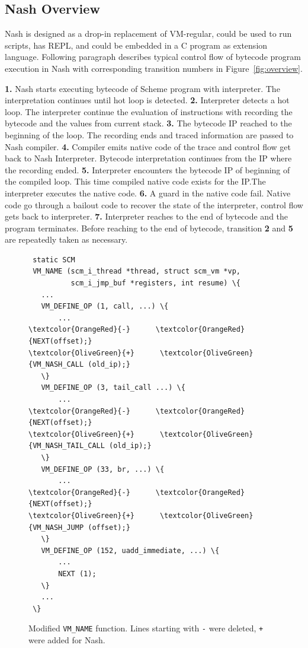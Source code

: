 \documentclass[preprint, 10pt]{sigplanconf}
\begin{document}
\subsection{Nash Overview}
\label{sec:overview}


Nash is designed as a drop-in replacement of VM-regular, could be used to run
scripts, has REPL, and could be embedded in a C program as extension language.
Following paragraph describes typical control flow of bytecode program
execution in Nash with corresponding transition numbers in
Figure~\hyperref[fig:overview]{\ref{fig:overview}}.

\textbf{1.} Nash starts executing bytecode of Scheme program with
interpreter. The interpretation continues until hot loop is detected.
\textbf{2.} Interpreter detects a hot loop. The interpreter continue the
evaluation of instructions with recording the bytecode and the values from
current stack.  \textbf{3.} The bytecode IP reached to the beginning of the
loop. The recording ends and traced information are passed to Nash compiler.
\textbf{4.} Compiler emits native code of the trace and control flow get back
to Nash Interpreter. Bytecode interpretation continues from the IP where the
recording ended. \textbf{5.} Interpreter encounters the bytecode IP of
beginning of the compiled loop. This time compiled native code exists for the
IP.\@ The interpreter executes the native code.  \textbf{6.} A guard in the
native code fail. Native code go through a bailout code to recover the state
of the interpreter, control flow gets back to interpreter.  \textbf{7.}
Interpreter reaches to the end of bytecode and the program terminates. Before
reaching to the end of bytecode, transition \textbf{2} and \textbf{5} are
repeatedly taken as necessary.

\begin{figure}
  \centering
  \small
\begin{Verbatim}
 static SCM
 VM_NAME (scm_i_thread *thread, struct scm_vm *vp,
          scm_i_jmp_buf *registers, int resume) \{
   ...
   VM_DEFINE_OP (1, call, ...) \{
       ...
\textcolor{OrangeRed}{-}      \textcolor{OrangeRed}{NEXT(offset);}
\textcolor{OliveGreen}{+}      \textcolor{OliveGreen}{VM_NASH_CALL (old_ip);}
   \}
   VM_DEFINE_OP (3, tail_call ...) \{
       ...
\textcolor{OrangeRed}{-}      \textcolor{OrangeRed}{NEXT(offset);}
\textcolor{OliveGreen}{+}      \textcolor{OliveGreen}{VM_NASH_TAIL_CALL (old_ip);}
   \}
   VM_DEFINE_OP (33, br, ...) \{
       ...
\textcolor{OrangeRed}{-}      \textcolor{OrangeRed}{NEXT(offset);}
\textcolor{OliveGreen}{+}      \textcolor{OliveGreen}{VM_NASH_JUMP (offset);}
   \}
   VM_DEFINE_OP (152, uadd_immediate, ...) \{
       ...
       NEXT (1);
   \}
   ...
 \}
\end{Verbatim}
\caption{Modified \texttt{VM\_NAME} function. Lines starting with \texttt{-}
  were deleted, \texttt{+} were added for Nash.}
\label{fig:vmnamenash}
\end{figure}
\end{document}
